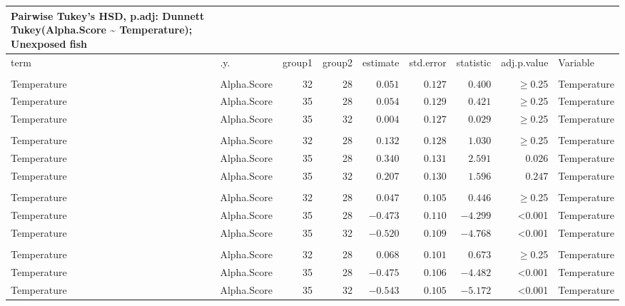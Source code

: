 \documentclass[
]{article}
\begin{document}
\begin{longtable}{llrrrrrrl}
\caption*{
{\large Pairwise Tukey's HSD, p.adj: Dunnett} \\ 
{\small Tukey(Alpha.Score \textasciitilde{} Temperature); Unexposed fish}
} \\ 
\toprule
term & .y. & group1 & group2 & estimate & std.error & statistic & adj.p.value & Variable \\ 
\midrule\addlinespace[2.5pt]
\multicolumn{9}{l}{Shannon} \\ 
\midrule\addlinespace[2.5pt]
Temperature & Alpha.Score & 32 & 28 & $0.051$ & $0.127$ & $0.400$ & $\geq$0.25 & Temperature \\ 
Temperature & Alpha.Score & 35 & 28 & $0.054$ & $0.129$ & $0.421$ & $\geq$0.25 & Temperature \\ 
Temperature & Alpha.Score & 35 & 32 & $0.004$ & $0.127$ & $0.029$ & $\geq$0.25 & Temperature \\ 
\midrule\addlinespace[2.5pt]
\multicolumn{9}{l}{Simpson} \\ 
\midrule\addlinespace[2.5pt]
Temperature & Alpha.Score & 32 & 28 & $0.132$ & $0.128$ & $1.030$ & $\geq$0.25 & Temperature \\ 
Temperature & Alpha.Score & 35 & 28 & $0.340$ & $0.131$ & $2.591$ & $0.026$ & Temperature \\ 
Temperature & Alpha.Score & 35 & 32 & $0.207$ & $0.130$ & $1.596$ & $0.247$ & Temperature \\ 
\midrule\addlinespace[2.5pt]
\multicolumn{9}{l}{Richness} \\ 
\midrule\addlinespace[2.5pt]
Temperature & Alpha.Score & 32 & 28 & $0.047$ & $0.105$ & $0.446$ & $\geq$0.25 & Temperature \\ 
Temperature & Alpha.Score & 35 & 28 & $-0.473$ & $0.110$ & $-4.299$ & <0.001 & Temperature \\ 
Temperature & Alpha.Score & 35 & 32 & $-0.520$ & $0.109$ & $-4.768$ & <0.001 & Temperature \\ 
\midrule\addlinespace[2.5pt]
\multicolumn{9}{l}{Phylogenetic} \\ 
\midrule\addlinespace[2.5pt]
Temperature & Alpha.Score & 32 & 28 & $0.068$ & $0.101$ & $0.673$ & $\geq$0.25 & Temperature \\ 
Temperature & Alpha.Score & 35 & 28 & $-0.475$ & $0.106$ & $-4.482$ & <0.001 & Temperature \\ 
Temperature & Alpha.Score & 35 & 32 & $-0.543$ & $0.105$ & $-5.172$ & <0.001 & Temperature \\ 
\bottomrule
\end{longtable}
\end{document}
